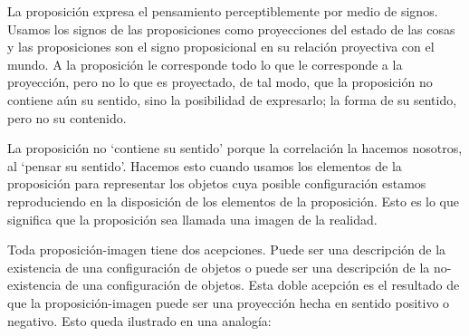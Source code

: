     La proposición expresa el pensamiento perceptiblemente por medio de signos.
    Usamos los signos de las proposiciones como proyecciones del estado de las cosas
    y las proposiciones son el signo proposicional en su relación proyectiva con el
    mundo. A la proposición le corresponde todo lo que le corresponde a la
    proyección, pero no lo que es proyectado, de tal modo, que la proposición no
    contiene aún su sentido, sino la posibilidad de expresarlo; la forma de su
    sentido, pero no su contenido.\autocite[cf.~][3.1,3.11-3.13]{wittgenstein1922tractatus} 

    La proposición no `contiene su sentido' porque la correlación la hacemos nosotros,
    al `pensar su sentido'. Hacemos esto cuando usamos los elementos de la
    proposición para representar los objetos cuya posible configuración estamos 
    reproduciendo en la disposición de los elementos de la proposición. Esto es lo
    que significa que la proposición sea llamada una imagen de la
    realidad.\autocite[cf.~][p.69]{anscombe1959iwt}  

    Toda proposición-imagen tiene dos acepciones. Puede ser una descripción de
    la existencia de una configuración de objetos o puede ser una descripción de la
    no-existencia de una configuración de objetos.\autocite[cf.~][p.~72]{anscombe1959iwt} 
    Esta doble acepción es el resultado de que la proposición-imagen puede ser una
    proyección hecha en sentido positivo o negativo.\autocite[cf.~][p.~74]{anscombe1959iwt} Esto
    queda ilustrado en una analogía:


